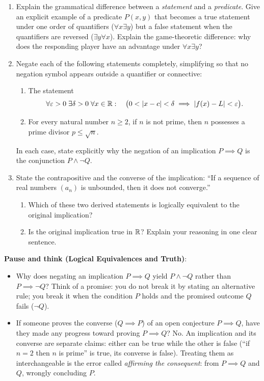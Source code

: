 \begin{enumerate}
  \item Explain the grammatical difference between a \emph{statement} and a \emph{predicate}. Give an explicit example of a predicate $P(x, y)$ that becomes a true statement under one order of quantifiers ($\forall x \exists y$) but a false statement when the quantifiers are reversed ($\exists y \forall x$). Explain the game-theoretic difference: why does the responding player have an advantage under $\forall x \exists y$?
  \item Negate each of the following statements completely, simplifying so that no negation symbol appears outside a quantifier or connective:
  \begin{enumerate}
    \item The statement
    \[
    \forall \varepsilon > 0 \; \exists \delta > 0 \; \forall x \in \mathbb{R} : \quad \bigl(0 < |x - c| < \delta \implies |f(x) - L| < \varepsilon\bigr).
    \]
    \item For every natural number $n \ge 2$, if $n$ is not prime, then $n$ possesses a prime divisor $p \le \sqrt{n}$.
  \end{enumerate}
  In each case, state explicitly why the negation of an implication $P \implies Q$ is the conjunction $P \land \neg Q$.
  \item State the contrapositive and the converse of the implication: ``If a sequence of real numbers $(a_n)$ is unbounded, then it does not converge.''
  \begin{enumerate}
    \item Which of these two derived statements is logically equivalent to the original implication?
    \item Is the original implication true in $\mathbb{R}$? Explain your reasoning in one clear sentence.
  \end{enumerate}
\end{enumerate}

\begin{recoverybox}
\textbf{Pause and think (Logical Equivalences and Truth)}:
\begin{itemize}
  \item Why does negating an implication $P \implies Q$ yield $P \land \neg Q$ rather than $P \implies \neg Q$? Think of a promise: you do not break it by stating an alternative rule; you break it when the condition $P$ holds and the promised outcome $Q$ fails ($\neg Q$).
  \item If someone proves the converse ($Q \implies P$) of an open conjecture $P \implies Q$, have they made any progress toward proving $P \implies Q$? No. An implication and its converse are separate claims: either can be true while the other is false (``if $n = 2$ then $n$ is prime'' is true, its converse is false). Treating them as interchangeable is the error called \emph{affirming the consequent}: from $P \implies Q$ and $Q$, wrongly concluding $P$.
\end{itemize}
\end{recoverybox}

